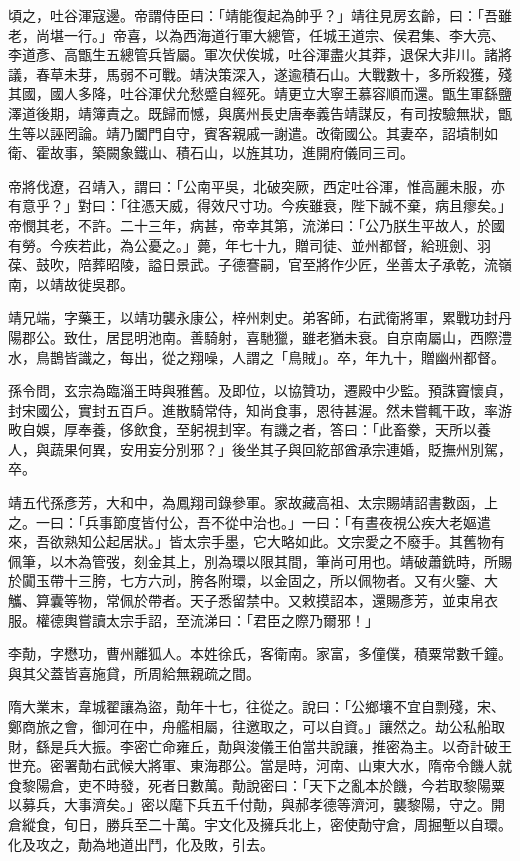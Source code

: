 \begin{pinyinscope}
 頃之，吐谷渾寇邊。帝謂侍臣曰：「靖能復起為帥乎？」靖往見房玄齡，曰：「吾雖老，尚堪一行。」帝喜，以為西海道行軍大總管，任城王道宗、侯君集、李大亮、李道彥、高甑生五總管兵皆屬。軍次伏俟城，吐谷渾盡火其莽，退保大非川。諸將議，春草未芽，馬弱不可戰。靖決策深入，遂逾積石山。大戰數十，多所殺獲，殘其國，國人多降，吐谷渾伏允愁蹙自經死。靖更立大寧王慕容順而還。甑生軍繇鹽澤道後期，靖簿責之。既歸而憾，與廣州長史唐奉義告靖謀反，有司按驗無狀，甑生等以誣罔論。靖乃闔門自守，賓客親戚一謝遣。改衛國公。其妻卒，詔墳制如衛、霍故事，築闕象鐵山、積石山，以旌其功，進開府儀同三司。



 帝將伐遼，召靖入，謂曰：「公南平吳，北破突厥，西定吐谷渾，惟高麗未服，亦有意乎？」對曰：「往憑天威，得效尺寸功。今疾雖衰，陛下誠不棄，病且瘳矣。」帝憫其老，不許。二十三年，病甚，帝幸其第，流涕曰：「公乃朕生平故人，於國有勞。今疾若此，為公憂之。」薨，年七十九，贈司徒、並州都督，給班劍、羽葆、鼓吹，陪葬昭陵，謚日景武。子德謇嗣，官至將作少匠，坐善太子承乾，流嶺南，以靖故徙吳郡。



 靖兄端，字藥王，以靖功襲永康公，梓州刺史。弟客師，右武衛將軍，累戰功封丹陽郡公。致仕，居昆明池南。善騎射，喜馳獵，雖老猶未衰。自京南屬山，西際澧水，鳥鵲皆識之，每出，從之翔噪，人謂之「鳥賊」。卒，年九十，贈幽州都督。



 孫令問，玄宗為臨淄王時與雅舊。及即位，以協贊功，遷殿中少監。預誅竇懷貞，封宋國公，實封五百戶。進散騎常侍，知尚食事，恩待甚渥。然未嘗輒干政，率游畋自娛，厚奉養，侈飲食，至躬視刲宰。有譏之者，答曰：「此畜豢，天所以養人，與蔬果何異，安用妄分別邪？」後坐其子與回紇部酋承宗連婚，貶撫州別駕，卒。



 靖五代孫彥芳，大和中，為鳳翔司錄參軍。家故藏高祖、太宗賜靖詔書數函，上之。一曰：「兵事節度皆付公，吾不從中治也。」一曰：「有晝夜視公疾大老嫗遣來，吾欲熟知公起居狀。」皆太宗手墨，它大略如此。文宗愛之不廢手。其舊物有佩筆，以木為管弢，刻金其上，別為環以限其間，筆尚可用也。靖破蕭銑時，所賜於闐玉帶十三胯，七方六刓，胯各附環，以金固之，所以佩物者。又有火鑒、大觿、算囊等物，常佩於帶者。天子悉留禁中。又敕摸詔本，還賜彥芳，並束帛衣服。權德輿嘗讀太宗手詔，至流涕曰：「君臣之際乃爾邪！」



 李勣，字懋功，曹州離狐人。本姓徐氏，客衛南。家富，多僮僕，積粟常數千鐘。與其父蓋皆喜施貸，所周給無親疏之間。



 隋大業末，韋城翟讓為盜，勣年十七，往從之。說曰：「公鄉壤不宜自剽殘，宋、鄭商旅之會，御河在中，舟艦相屬，往邀取之，可以自資。」讓然之。劫公私船取財，繇是兵大振。李密亡命雍丘，勣與浚儀王伯當共說讓，推密為主。以奇計破王世充。密署勣右武候大將軍、東海郡公。當是時，河南、山東大水，隋帝令饑人就食黎陽倉，吏不時發，死者日數萬。勣說密曰：「天下之亂本於饑，今若取黎陽粟以募兵，大事濟矣。」密以麾下兵五千付勣，與郝孝德等濟河，襲黎陽，守之。開倉縱食，旬日，勝兵至二十萬。宇文化及擁兵北上，密使勣守倉，周掘塹以自環。化及攻之，勣為地道出鬥，化及敗，引去。




\end{pinyinscope}
